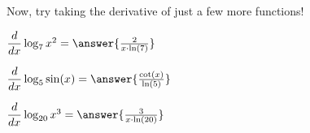 \documentclass{ximera}
\begin{document}
Now, try taking the derivative of just a few more functions!

\begin{problem}
$\dfrac{d}{dx}\log_{7}x^2 = \answer{\frac{2}{x \cdot \ln(7)}}$
\end{problem}


\begin{problem}
$\dfrac{d}{dx}\log_{5}\sin(x) = \answer{\frac{\cot(x)}{\ln(5)}}$
\end{problem}

\begin{problem}
$\dfrac{d}{dx}\log_{20}x^3 = \answer{\frac{3}{x \cdot \ln(20)}}$
\end{problem}
\end{document}
